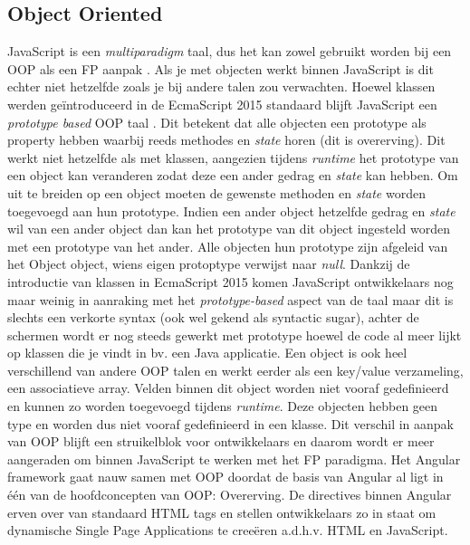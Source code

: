 \subsection{Object Oriented}
JavaScript is een \textit{multiparadigm} taal, dus het kan zowel gebruikt worden bij een OOP als een FP aanpak \autocite{Atencio2016}. Als je met objecten werkt binnen JavaScript is dit echter niet hetzelfde zoals je bij andere talen zou verwachten. Hoewel klassen werden geïntroduceerd in de EcmaScript 2015 standaard blijft JavaScript een \textit{prototype based} OOP taal \autocite{Blaschek1994}. Dit betekent dat alle objecten een prototype als property hebben waarbij reeds methodes en \textit{state} horen (dit is overerving). Dit werkt niet hetzelfde als met klassen, aangezien tijdens \textit{runtime} het prototype van een object kan veranderen zodat deze een ander gedrag en \textit{state} kan hebben. Om uit te breiden op een object moeten de gewenste methoden en \textit{state} worden toegevoegd aan hun prototype. Indien een ander object hetzelfde gedrag en \textit{state} wil van een ander object dan kan het prototype van dit object ingesteld worden met een prototype van het ander. Alle objecten hun prototype zijn afgeleid van het Object object, wiens eigen protoptype verwijst naar \textit{null}. Dankzij de introductie van klassen in EcmaScript 2015 komen JavaScript ontwikkelaars nog maar weinig in aanraking met het \textit{prototype-based} aspect van de taal maar dit is slechts een verkorte syntax (ook wel gekend als syntactic sugar), achter de schermen wordt er nog steeds gewerkt met prototype hoewel de code al meer lijkt op klassen die je vindt in bv. een Java applicatie. Een object is ook heel verschillend van andere OOP talen en werkt eerder als een key/value verzameling, een associatieve array. Velden binnen dit object worden niet vooraf gedefinieerd en kunnen zo worden toegevoegd tijdens \textit{runtime}. Deze objecten hebben geen type en worden dus niet vooraf gedefinieerd in een klasse. Dit verschil in aanpak van OOP blijft een struikelblok voor ontwikkelaars en daarom wordt er meer aangeraden om binnen JavaScript te werken met het FP paradigma. Het Angular framework gaat nauw samen met OOP doordat de basis van Angular al ligt in één van de hoofdconcepten van OOP: Overerving. De directives binnen Angular erven over van standaard HTML tags en stellen ontwikkelaars zo in staat om dynamische Single Page Applications te creeëren a.d.h.v. HTML en JavaScript.

